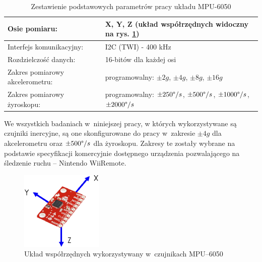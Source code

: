 \begin{table}[h]
	\caption[Zestawienie podstawowych parametrów pracy układu MPU-6050]{Zestawienie podstawowych parametrów pracy układu MPU-6050}
	\label{tab:characteristics:mpu:spec}
	\noindent
	\small
	\centering
	\begin{tabular}{|p{5cm}|p{8cm}|}
		\hline 
		Osie pomiaru:                             & X, Y, Z \newline (układ współrzędnych widoczny na rys. \ref{fig:characteristics:imu:space})               \\
		\hline
		Interfejs komunikacyjny:                  & I2C (TWI) - 400 kHz                                                                                           \\
		\hline
		Rozdzielczość danych:                   & 16-bitów dla każdej osi                                                                                     \\
		\hline
		Zakres pomiarowy  \newline akcelerometru: & programowalny: \newline $\pm2g$, \textbf{$\pm4g$}, $\pm8g$, $\pm16g$                                          \\
		\hline
		Zakres pomiarowy żyroskopu:              & programowalny: \newline $\pm250\degree/s$, \textbf{$\pm500\degree/s$}, $\pm1000\degree/s$, $\pm2000\degree/s$ \\
		\hline
	\end{tabular} 	
\end{table} 
																																									
We wszystkich badaniach w~niniejszej pracy, w których wykorzystywane są czujniki inercyjne, są one skonfigurowane do pracy w~zakresie  $\pm4g$ dla akcelerometru oraz $\pm500\degree/s$ dla żyroskopu. Zakresy te zostały wybrane na podstawie specyfikacji komercyjnie dostępnego urządzenia pozwalającego na śledzenie ruchu -- Nintendo WiiRemote.
																																									
\begin{savenotes}
	\begin{figure}[!htb]
		\centering 
		\includegraphics[width=0.35\textwidth]{images/imuCoordinationSpace.eps}	
		\caption{Układ współrzędnych wykorzystywany w~czujnikach MPU--6050}
		\label{fig:characteristics:imu:space}
	\end{figure}
\end{savenotes}
																																											
